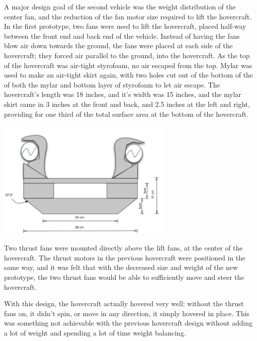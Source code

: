 A major design goal of the second vehicle was the weight distribution of the center fan, and the reduction of the fan motor size required to lift the hovercraft. In the first
prototype, two fans were used to lift the hovercraft, placed half-way between the front end
and back end of the vehicle. Instead of having the fans blow air down towards the ground, the fans were placed at each side
of the hovercraft; they forced air parallel to the ground, into the hovercraft. As the top of the hovercraft was
air-tight styrofoam, no air escaped from the top.  Mylar was used to make an air-tight skirt again, with two holes cut out
of the bottom of the of both the mylar and bottom layer of styrofoam to let air escape. The hovercraft's length was 18 inches,
and it's width was 15 inches, and the mylar skirt came in 3 inches at the front and back, and 2.5 inches at the left and right,
providing for one third of the total surface area at the bottom of the hovercraft.

\begin{minipage}{6.5in}
\begin{center}
  \includegraphics[width=85mm]{imageSources/Front2.png}
\end{center}
\label{Front2}
\end{minipage}

Two thrust fans were mounted directly above the lift fans, at the center of the hovercraft. The thrust motors in the previous
hovercraft were positioned in the same way, and it was felt that with the decreased size and weight of the new prototype, the 
two thrust fans would be able to sufficiently move and steer the hovercraft.

With this design, the hovercraft actually hovered very well: without the thrust fans on, it didn't spin, or move in 
any direction, it simply hovered in place. This was something not achievable with the previous hovercraft design 
without adding a lot of weight and spending a lot of time weight balancing.

